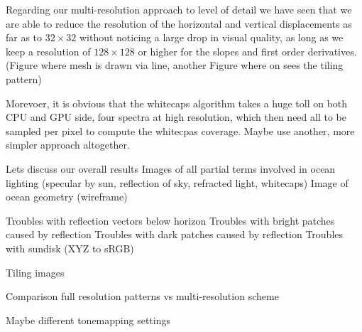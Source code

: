 %

Regarding our multi-resolution approach to level of detail we have seen that we are able to reduce the resolution of the horizontal
and vertical displacements as far as to $32\times32$ without
noticing a large drop in visual quality, as long as we keep a
resolution of $128\times128$ or higher for the slopes and first
order derivatives. (Figure where mesh is drawn via line, another
Figure where on sees the tiling pattern)

Morevoer, it is obvious that the whitecaps algorithm takes a huge
toll on both CPU and GPU side, four spectra at high resolution,
which then need all to be sampled per pixel to compute the
whitecpas coverage. Maybe use another, more simpler approach altogether.

Lets discuss our overall results
Images of all partial terms involved in ocean lighting (specular by sun,
reflection of sky, refracted light, whitecaps)
Image of ocean geometry (wireframe)

Troubles with reflection vectors below horizon
Troubles with bright patches caused by reflection
Troubles with dark patches caused by reflection
Troubles with sundisk (XYZ to sRGB)

Tiling images

Comparison full resolution patterns vs multi-resolution scheme

Maybe different tonemapping settings